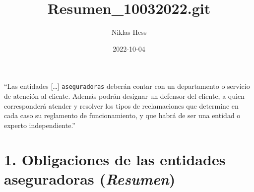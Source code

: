 \documentclass[
]{article}
\title{Resumen\_10032022.git}
\author{Niklas Hess}
\date{2022-10-04}
\begin{document}
\maketitle

``Las entidades {[}\ldots{]} \texttt{aseguradoras} deberán contar con un
departamento o servicio de atención al cliente. Además podrán designar
un defensor del cliente, a quien corresponderá atender y resolver los
tipos de reclamaciones que determine en cada caso su reglamento de
funcionamiento, y que habrá de ser una entidad o experto
independiente.''

\hypertarget{obligaciones-de-las-entidades-aseguradoras-resumen}{%
\section{\texorpdfstring{1. Obligaciones de las entidades aseguradoras
(\emph{Resumen})}{1. Obligaciones de las entidades aseguradoras (Resumen)}}\label{obligaciones-de-las-entidades-aseguradoras-resumen}}
\end{document}
